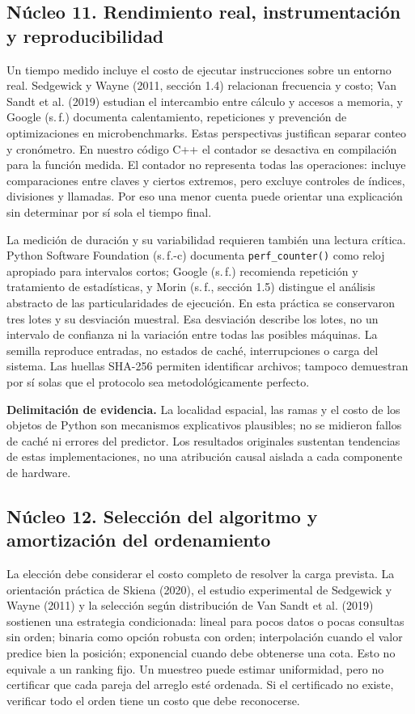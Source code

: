 \subsection{Núcleo 11. Rendimiento real, instrumentación y reproducibilidad}
Un tiempo medido incluye el costo de ejecutar instrucciones sobre un entorno real. Sedgewick y Wayne (2011, sección 1.4) relacionan frecuencia y costo; Van Sandt et al. (2019) estudian el intercambio entre cálculo y accesos a memoria, y Google (s.\,f.) documenta calentamiento, repeticiones y prevención de optimizaciones en microbenchmarks. Estas perspectivas justifican separar conteo y cronómetro. En nuestro código C++ el contador se desactiva en compilación para la función medida. El contador no representa todas las operaciones: incluye comparaciones entre claves y ciertos extremos, pero excluye controles de índices, divisiones y llamadas. Por eso una menor cuenta puede orientar una explicación sin determinar por sí sola el tiempo final.

La medición de duración y su variabilidad requieren también una lectura crítica. Python Software Foundation (s.\,f.-c) documenta \texttt{perf\_counter()} como reloj apropiado para intervalos cortos; Google (s.\,f.) recomienda repetición y tratamiento de estadísticas, y Morin (s.\,f., sección 1.5) distingue el análisis abstracto de las particularidades de ejecución. En esta práctica se conservaron tres lotes y su desviación muestral. Esa desviación describe los lotes, no un intervalo de confianza ni la variación entre todas las posibles máquinas. La semilla reproduce entradas, no estados de caché, interrupciones o carga del sistema. Las huellas SHA-256 permiten identificar archivos; tampoco demuestran por sí solas que el protocolo sea metodológicamente perfecto.

\textbf{Delimitación de evidencia.} La localidad espacial, las ramas y el costo de los objetos de Python son mecanismos explicativos plausibles; no se midieron fallos de caché ni errores del predictor. Los resultados originales sustentan tendencias de estas implementaciones, no una atribución causal aislada a cada componente de hardware.

\subsection{Núcleo 12. Selección del algoritmo y amortización del ordenamiento}
La elección debe considerar el costo completo de resolver la carga prevista. La orientación práctica de Skiena (2020), el estudio experimental de Sedgewick y Wayne (2011) y la selección según distribución de Van Sandt et al. (2019) sostienen una estrategia condicionada: lineal para pocos datos o pocas consultas sin orden; binaria como opción robusta con orden; interpolación cuando el valor predice bien la posición; exponencial cuando debe obtenerse una cota. Esto no equivale a un ranking fijo. Un muestreo puede estimar uniformidad, pero no certificar que cada pareja del arreglo esté ordenada. Si el certificado no existe, verificar todo el orden tiene un costo que debe reconocerse.

